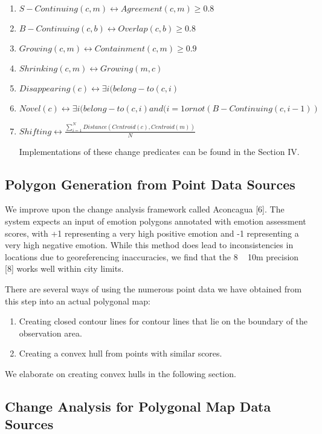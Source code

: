 \documentclass[conference]{IEEEtran}
\begin{document}
\begin{enumerate}
	\item $S-Continuing (c,m)  \leftrightarrow  Agreement (c,m) \geq 0.8$
	\item $B-Continuing(c,b)  \leftrightarrow  Overlap (c,b) \geq 0.8$
	\item $Growing(c,m)  \leftrightarrow  Containment (c,m) \geq 0.9 $
	\item $Shrinking(c,m) \leftrightarrow Growing (m,c)$
	\item $Disappearing(c) \leftrightarrow \exists i (belong-to(c,i) $
	\item $Novel (c) \leftrightarrow  \exists i (belong-to(c,i) and (i=1 or not(B-Continuing(c,i-1)) $
	\item $Shifting \leftrightarrow \frac{\sum_{i=1}^{N}Distance (Centroid(c), Centroid(m))}{N}$

Implementations of these change predicates can be found in the Section IV.
\end{enumerate}



\subsection{Polygon Generation from Point Data Sources}
We improve upon the change analysis framework called Aconcagua [6]. The system expects an input of emotion polygons annotated with emotion assessment scores, with +1 representing a very high positive emotion and -1 representing a very high negative emotion. While this method does lead to inconsistencies in locations due to georeferencing inaccuracies, we find that the 8 ~ 10m precision [8] works well within city limits.

There are several ways of using the numerous point data we have obtained from this step into an actual polygonal map: 

\begin{enumerate}

\item Creating closed contour lines for contour lines that lie on the boundary of the observation area.
\item Creating a convex hull from points with similar scores.
\end{enumerate}

We elaborate on creating convex hulls in the following section.

\subsection{Change Analysis for Polygonal Map Data Sources}
\end{document}
